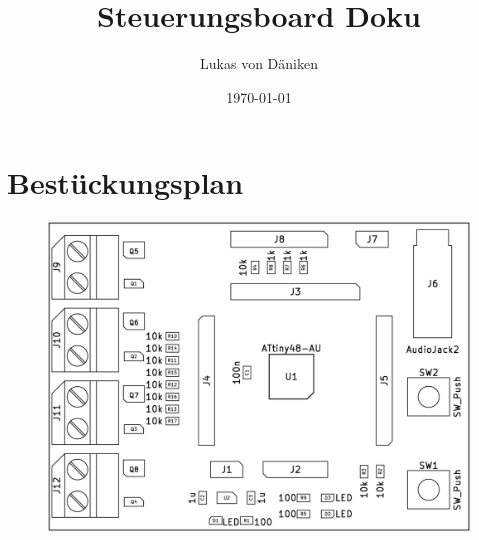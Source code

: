 \documentclass[11pt]{article}
\begin{document}
\title{Steuerungsboard Doku}
\author{Lukas von Däniken}
\date{\today}
\maketitle
\newpage

\section{Bestückungsplan}
\begin{figure}[h]
	\includegraphics[width=1\textwidth]{graphics/Bestueckungsplan.png}
\end{figure}
\end{document}
